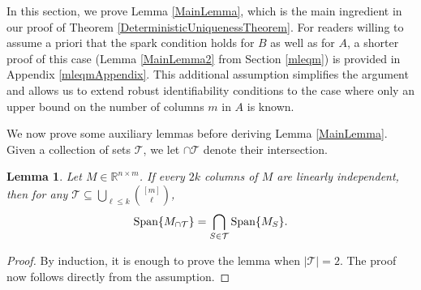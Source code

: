 \documentclass[journal, twocolumn]{IEEEtran}
\newtheorem{lemma}{Lemma}
\begin{document}
In this section, we prove Lemma \ref{MainLemma}, which is the main ingredient in our proof of Theorem \ref{DeterministicUniquenessTheorem}. For readers willing to assume a priori that the spark condition holds for $B$ as well as for $A$, a shorter proof of this case (Lemma \ref{MainLemma2} from Section \ref{mleqm}) is provided in Appendix \ref{mleqmAppendix}. This additional assumption simplifies the argument and allows us to extend robust identifiability conditions to the case where only an upper bound on the number of columns $m$ in $A$ is known. 

We now prove some auxiliary lemmas before deriving Lemma \ref{MainLemma}.  Given a collection of sets $\mathcal{T}$, we let $\cap \mathcal{T}$ denote their intersection.

\begin{lemma}\label{SpanIntersectionLemma}
Let $M \in \mathbb{R}^{n \times m}$. If every $2k$ columns of $M$ are linearly independent, then for any $\mathcal{T} \subseteq \bigcup_{\ell \leq k} {[m] \choose \ell}$,
\begin{align}
\text{\rm Span}\{M_{\cap \mathcal{T}}\}  = \bigcap_{S \in \mathcal{T}} \text{\rm Span}\{M_S\}.
\end{align}
\end{lemma}

\begin{proof}By induction, it is enough to prove the lemma when $|\mathcal{T}| = 2$. The proof now follows directly from the assumption.
\end{proof}

\end{document}

